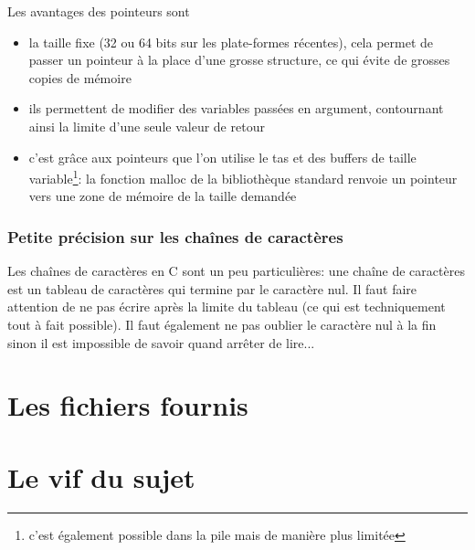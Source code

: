 \documentclass[a4paper,10pt]{article} %
\begin{document}
Les avantages des pointeurs sont
\begin{itemize}
\item la taille fixe (32 ou 64 bits sur les plate-formes récentes), cela permet de passer un pointeur à la place d'une grosse structure, ce qui évite de grosses copies de mémoire
\item ils permettent de modifier des variables passées en argument, contournant ainsi la limite d'une seule valeur de retour
\item c'est grâce aux pointeurs que l'on utilise le tas et des buffers de taille variable\footnote{c'est également possible dans la pile mais de manière plus limitée}: la fonction malloc de la bibliothèque standard renvoie un pointeur vers une zone de mémoire de la taille demandée
\end{itemize}

\subsubsection{Petite précision sur les chaînes de caractères}
Les chaînes de caractères en C sont un peu particulières: une chaîne de caractères est un tableau de caractères qui termine par le caractère nul. Il faut faire attention de ne pas écrire après la limite du tableau (ce qui est techniquement tout à fait possible). Il faut également ne pas oublier le caractère nul à la fin sinon il est impossible de savoir quand arrêter de lire...

\section{\label{fichiers_fournis}Les fichiers fournis}
\section{Le vif du sujet}
\end{document}
